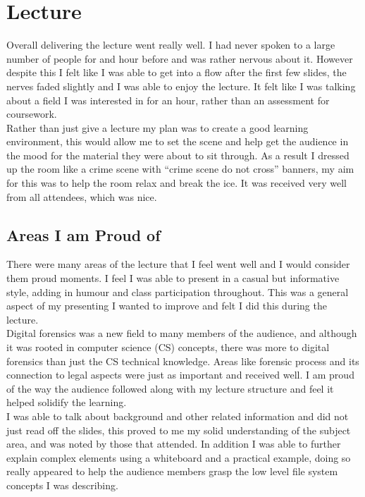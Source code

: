 \documentclass[a4paper,11pt]{article}
\begin{document}
\section{Lecture}
Overall delivering the lecture went really well. I had never spoken to a large number of people for and hour before and was rather nervous about it. However despite this I felt like I was able to get into a flow after the first few slides, the nerves faded slightly and I was able to enjoy the lecture. It felt like I was talking about a field I was interested in for an hour, rather than an assessment for coursework. \\

Rather than just give a lecture my plan was to create a good learning environment, this would allow me to set the scene and help get the audience in the mood for the material they were about to sit through. As a result I dressed up the room like a crime scene with ``crime scene do not cross'' banners, my aim for this was to help the room relax and break the ice. It was received very well from all attendees, which was nice.\\

\subsection{Areas I am Proud of}
There were many areas of the lecture that I feel went well and I would consider them proud moments. I feel I was able to present in a casual but informative style, adding in humour and class participation throughout. This was a general aspect of my presenting I wanted to improve and felt I did this during the lecture.\\

Digital forensics was a new field to many members of the audience, and although it was rooted in computer science (CS) concepts, there was more to digital forensics than just the CS technical knowledge. Areas like forensic process and its connection to legal aspects were just as important and received well. I am proud of the way the audience followed along with my lecture structure and feel it helped solidify the learning. \\

I was able to talk about background and other related information and did not just read off the slides, this proved to me my solid understanding of the subject area, and was noted by those that attended. In addition I was able to further explain complex elements using a whiteboard and a practical example, doing so really appeared to help the audience members grasp the low level file system concepts I was describing.\\
\end{document}
